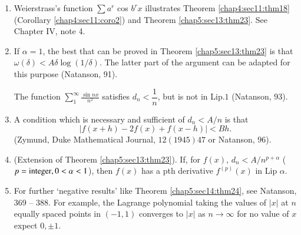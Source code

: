 \begin{enumerate}
\item Weierstrass's function $\sum a^r$ cos $b^r x$ illustrates
  Theorem \ref{chap4:sec11:thm18} (Corollary \ref{chap4:sec11:coro2})
  and Theorem \ref{chap5:sec13:thm23}. See Chapter IV,  note 4. 
\item If $\alpha =1$, the best that can be proved in
  Theorem \ref{chap5:sec13:thm23} is
  that $\omega (\delta) < A \delta \log (1/ \delta)$. The latter part
  of the argument can be adapted for this purpose (Natanson, 91). 
  
  The function $\sum_1^\infty \frac{\sin nx}{n^2}$ satisfies $d_n <
  \dfrac{1}{n}$, but is not in Lip.$1$ (Natanson, $93$). 
\item A condition which is necessary and sufficient of $d_n <  A/n$ is that 
  $$
  |f(x+h)- 2f (x) + f(x-h) | <   Bh.
  $$
  (Zymund, Duke Mathematical Journal, $12(1945) 47$ or Natanson, $96$).
\item (Extension of Theorem \ref{chap5:sec13:thm23}). If, for $f(x)$,
  $d_n <A/n^{p+ 
  \alpha}$  ($p=\break \text{integer},  0 <  \alpha < 1$),  then $f(x)$ has a
  pth derivative $f^{(p)}(x)$ in Lip $\alpha$. 
\item For further `negative results' like Theorem \ref{chap5:sec14:thm24}, see Natanson,
  369 -- 388. For example, the Lagrange polynomial taking the values
  of $| x|$ at $n$ equally spaced points in $(-1,1)$ 
  converges to $|x|$ as $n \to \infty$ for no value of $x$ expect $0, \pm 1$.
\end{enumerate}
